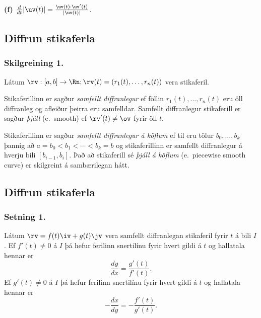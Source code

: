{\bf (f)}  $\frac{d}{dt}|\uv(t)|=\frac{\uv(t)\cdot\uv'(t)}{|\uv(t)|}$.

\medskip

 


\subsection{Diffrun stikaferla}

\subsubsection{Skilgreining 1.}
Látum $\rv:  [a,b]\rightarrow \Rn; \rv(t)=(r_1(t),\ldots,r_n(t))$ vera stikaferil.  

Stikaferillinn er sagður {\em samfellt diffranlegur} ef föllin
$r_1(t),\ldots,r_n(t)$ eru öll diffranleg og afleiður þeirra eru
samfelldar.  Samfellt diffranlegur stikaferill er sagður {\em þjáll}
(e.~smooth) ef $\rv'(t)\neq\ov$ fyrir öll $t$. 

\medskip
Stikaferillinn er sagður {\em samfellt diffranlegur á köflum} ef til eru
tölur $b_0,\ldots,b_k$ þannig að  $a=b_0<b_1<\cdots<b_k=b$ og
stikaferillinn er samfellt diffranlegur á hverju bili $[b_{i-1}, b_i]$.
Það að stikaferill sé {\em þjáll á köflum}  
(e.~piecewise smooth curve) er
skilgreint á sambærilegan hátt. 



\subsection{Diffrun stikaferla}
 \subsubsection{Setning 1.}
Látum $\rv=f(t)\iv+g(t)\jv$ vera samfellt diffranlegan stikaferil fyrir $t$ á bili $I$. Ef $f'(t) \neq 0$ á $I$ þá hefur ferilinn snertilínu fyrir hvert gildi á $t$ og hallatala hennar er 
\begin {equation*}
 \frac{dy}{dx} = \frac{g'(t)}{f'(t)}.
\end {equation*}
Ef $g'(t) \neq 0$ á $I$ þá hefur ferilinn snertilínu fyrir hvert gildi á $t$ og hallatala hennar er
\begin {equation*}
 -\frac{dx}{dy} = -\frac{f'(t)}{g'(t)}.
\end {equation*}

% 
 



